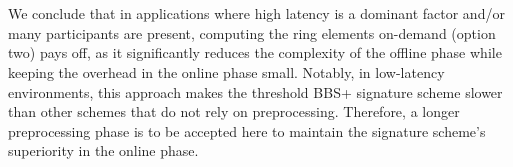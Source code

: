 \\\\
We conclude that in applications where high latency is a dominant factor and/or many participants are present, computing the ring elements on-demand (option two) pays off, as it significantly reduces the complexity of the offline phase while keeping the overhead in the online phase small. Notably, in low-latency environments, this approach makes the threshold BBS+ signature scheme slower than other schemes that do not rely on preprocessing. Therefore, a longer preprocessing phase is to be accepted here to maintain the signature scheme's superiority in the online phase.
